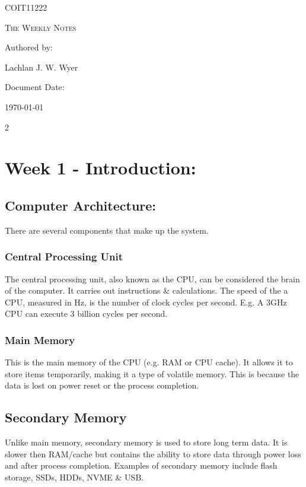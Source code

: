 \documentclass[a4paper]{report}
\begin{document}
	\begin{titlepage}
		\centering
		{\Huge \textsc{COIT11222}\par}
		\vspace{1cm}
		{\Large \textsc{The Weekly Notes}\par}
		\vspace{2.5cm}
		\vfill
		Authored by:\par
		Lachlan J. W. Wyer
		\vfill
		{\large Document Date: \par}
		\date{20/09/2025}
		{\large \today\par}
	\end{titlepage}
\begin{flushleft}
\begin{multicols}{2}
	\section*{Week 1 - Introduction:}
	\subsection*{Computer Architecture:}
	There are several components that make up the system.

	\subsubsection*{Central Processing Unit}
	The central processing unit, also known as the CPU, can be considered the brain of the computer. It carries out instructions \& calculations. The speed of the a CPU, measured in Hz, is the number of clock cycles per second. E.g. A 3GHz CPU can execute 3 billion cycles per second.

	\subsubsection*{Main Memory}
	This is the main memory of the CPU (e.g. RAM or CPU cache). It allows it to store items temporarily, making it a type of volatile memory. This is because the data is lost on power reset or the process completion.

	\subsection*{Secondary Memory}
	Unlike main memory, secondary memory is used to store long term data. It is slower then RAM/cache but contains the ability to store data through power loss and after process completion. Examples of secondary memory include flash storage, SSDs, HDDs, NVME \& USB.


\end{multicols}
\end{flushleft}
\end{document}
